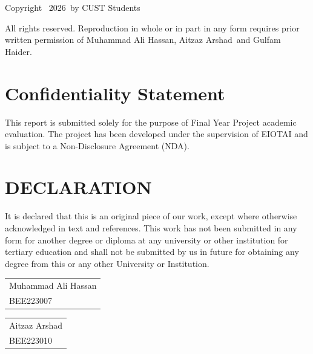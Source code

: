 \documentclass[12pt,a4paper]{report}
\newcommand{\studentonename}{Muhammad Ali Hassan}
\newcommand{\studentonereg}{BEE223007}
\newcommand{\studenttwoname}{Aitzaz Arshad}
\newcommand{\studenttworeg}{BEE223010}
\newcommand{\studentthreename}{Gulfam Haider}
\newcommand{\submissionyear}{2026}
\begin{document}
	\singlespacing
	\setcounter{page}{2}
	
	\thispagestyle{plain}
	\begin{center}
		{\fontsize{12}{14}\selectfont
			Copyright \textcopyright\ \submissionyear\ by CUST Students
			
			\vspace{0.5cm}
			
			All rights reserved. Reproduction in whole or in part in any form requires prior written permission of
			\studentonename, \studenttwoname\ and \studentthreename.
		}
	\end{center}
	\clearpage
	\chapter*{Confidentiality Statement}
	
	This report is submitted solely for the purpose of Final Year Project academic evaluation. The project has been developed under the supervision of EIOTAI and is subject to a Non-Disclosure Agreement (NDA).
	\newpage
	\chapter*{DECLARATION}
	\thispagestyle{plain}
	
	It is declared that this is an original piece of our work, except where otherwise acknowledged in text and references. This work has not been submitted in any form for another degree or diploma at any university or other institution for tertiary education and shall not be submitted by us in future for obtaining any degree from this or any other University or Institution.
	
	\vspace{2cm}
	
	\noindent
	\begin{tabular}{@{}l@{}}
		\studentonename \\
		\studentonereg
	\end{tabular}
	
	\vspace{1cm}
	
	\noindent
	\begin{tabular}{@{}l@{}}
		\studenttwoname \\
		\studenttworeg
	\end{tabular}
	
\end{document}
